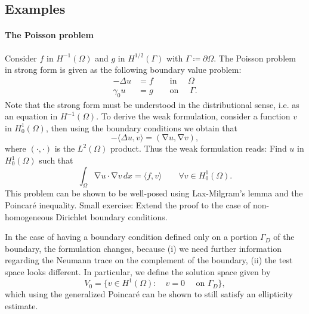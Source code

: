 \documentclass{article}
\DeclareMathOperator{\grad}{\nabla}
\newcommand{\tin}{\text{in }}
\newcommand{\ton}{\text{on }}
\begin{document}
\subsection{Examples}
\paragraph{The Poisson problem} Consider $f$ in $H^{-1}(\Omega)$ and $g$ in $H^{1/2}(\Gamma)$ with $\Gamma\coloneqq \partial\Omega$. The Poisson problem in strong form is given as the following boundary value problem: 
    \begin{align*}
        -\Delta u  &= f \qquad \tin\quad\Omega\\
        \gamma_0 u &= g \qquad \ton\quad \Gamma.
    \end{align*}
Note that the strong form must be understood in the distributional sense, i.e. as an equation in $H^{-1}(\Omega)$. To derive the weak formulation, consider a function $v$ in $H_0^1(\Omega)$, then using the boundary conditions we obtain that 
    $$ -\langle \Delta u,v\rangle = (\grad u, \grad v),$$
where $(\cdot, \cdot)$ is the $L^2(\Omega)$ product. Thus the weak formulation reads: Find $u$ in $H_0^1(\Omega)$ such that 
    $$ \int_\Omega \grad u\cdot \grad v\,dx = \langle f, v\rangle \qquad \forall v\in H_0^1(\Omega).$$
This problem can be shown to be well-posed using Lax-Milgram's lemma and the Poincaré inequality. Small exercise: Extend the proof to the case of non-homogeneous Dirichlet boundary conditions.

In the case of having a boundary condition defined only on a portion $\Gamma_D$ of the boundary, the formulation changes, because (i) we need further information regarding the Neumann trace on the complement of the boundary, (ii) the test space looks different. In particular, we define the solution space given by 
    $$ V_0 = \{v\in H^1(\Omega): \quad v = 0 \quad\text{ on $\Gamma_D$}\}, $$
which using the generalized Poincaré can be shown to still satisfy an ellipticity estimate. 
\end{document}
